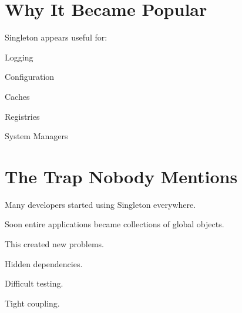 \documentclass[11pt,a4paper]{book}
\begin{document}

\section{Why It Became Popular}

Singleton appears useful for:


Logging


Configuration


Caches


Registries


System Managers


\section{The Trap Nobody Mentions}

\begin{trap}

Many developers started using
Singleton everywhere.


Soon entire applications became
collections of global objects.


This created new problems.


Hidden dependencies.


Difficult testing.


Tight coupling.

\end{trap}
\end{document}
